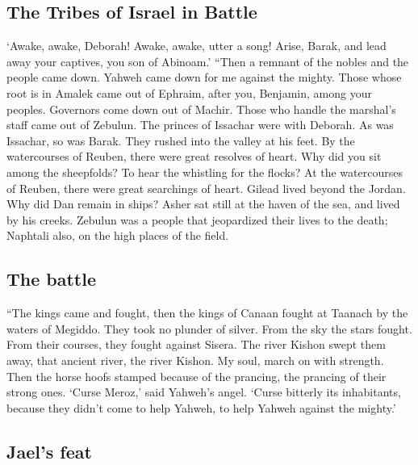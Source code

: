 \hypertarget{the-tribes-of-israel-in-battle}{%
\subsection{The Tribes of Israel in
Battle}\label{the-tribes-of-israel-in-battle}}

 `Awake, awake, Deborah! Awake, awake, utter a song!
Arise, Barak, and lead away your captives, you son of Abinoam.'
 ``Then a remnant of the nobles and the people came down.
Yahweh came down for me against the mighty.  Those whose
root is in Amalek came out of Ephraim, after you, Benjamin, among your
peoples. Governors come down out of Machir. Those who handle the
marshal's staff came out of Zebulun.  The princes of
Issachar were with Deborah. As was Issachar, so was Barak. They rushed
into the valley at his feet. By the watercourses of Reuben, there were
great resolves of heart.  Why did you sit among the
sheepfolds? To hear the whistling for the flocks? At the watercourses of
Reuben, there were great searchings of heart.  Gilead
lived beyond the Jordan. Why did Dan remain in ships? Asher sat still at
the haven of the sea, and lived by his creeks.  Zebulun
was a people that jeopardized their lives to the death; Naphtali also,
on the high places of the field.

\hypertarget{the-battle}{%
\subsection{The battle}\label{the-battle}}

 ``The kings came and fought, then the kings of Canaan
fought at Taanach by the waters of Megiddo. They took no plunder of
silver.  From the sky the stars fought. From their
courses, they fought against Sisera.  The river Kishon
swept them away, that ancient river, the river Kishon. My soul, march on
with strength.  Then the horse hoofs stamped because of
the prancing, the prancing of their strong ones.  `Curse
Meroz,' said Yahweh's angel. `Curse bitterly its inhabitants, because
they didn't come to help Yahweh, to help Yahweh against the mighty.'

\hypertarget{jaels-feat}{%
\subsection{Jael's feat}\label{jaels-feat}}

